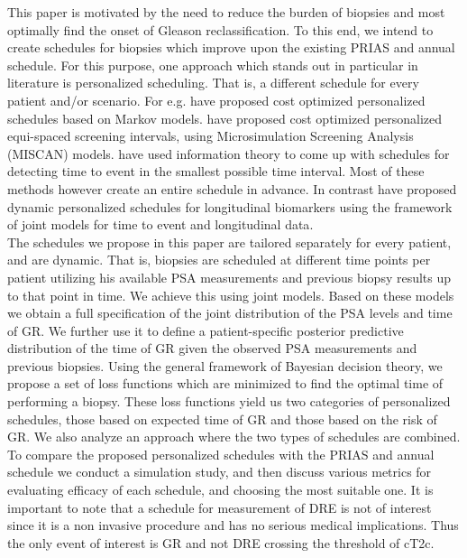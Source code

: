 This paper is motivated by the need to reduce the burden of biopsies and most optimally find the onset of Gleason reclassification. To this end, we intend to create schedules for biopsies which improve upon the existing PRIAS and annual schedule. For this purpose, one approach which stands out in particular in literature is personalized scheduling. That is, a different schedule for every patient and/or scenario. For e.g. \cite{bebu2017OptimalScreening} have proposed cost optimized personalized schedules based on Markov models. \cite{oMahonyOptimaInterval} have proposed cost optimized personalized equi-spaced screening intervals, using Microsimulation Screening Analysis (MISCAN) models. \cite{parmigiani1998designing} have used information theory to come up with schedules for detecting time to event in the smallest possible time interval. Most of these methods however create an entire schedule in advance. In contrast \cite{drizopoulosPersScreening} have proposed dynamic personalized schedules for longitudinal biomarkers using the framework of joint models for time to event and longitudinal data\citep{tsiatis2004joint,rizopoulos2012joint}.\\

The schedules we propose in this paper are tailored separately for every patient, and are dynamic. That is, biopsies are scheduled at different time points per patient utilizing his available PSA measurements and previous biopsy results up to that point in time. We achieve this using joint models. Based on these models we obtain a full specification of the joint distribution of the PSA levels and time of GR. We further use it to define a patient-specific posterior predictive distribution of the time of GR given the observed PSA measurements and previous biopsies. Using the general framework of Bayesian decision theory, we propose a set of loss functions which are minimized to find the optimal time of performing a biopsy. These loss functions yield us two categories of personalized schedules, those based on expected time of GR and those based on the risk of GR. We also analyze an approach where the two types of schedules are combined. To compare the proposed personalized schedules with the PRIAS and annual schedule we conduct a simulation study, and then discuss various metrics for evaluating efficacy of each schedule, and choosing the most suitable one. It is important to note that a schedule for measurement of DRE is not of interest since it is a non invasive procedure and has no serious medical implications. Thus the only event of interest is GR and not DRE crossing the threshold of cT2c.\\

